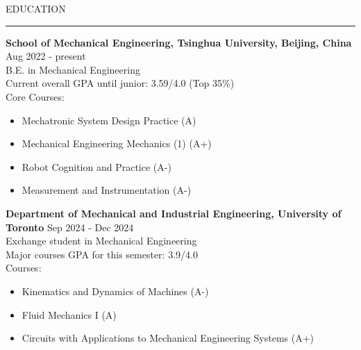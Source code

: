 \documentclass{resume} %
\renewenvironment{rSection}[1]{
\sectionskip
\textcolor{TsinghuaPurple}{\MakeUppercase{#1}}
\sectionlineskip
\hrule
\begin{list}{}{
\setlength{\leftmargin}{0em}
}
\item[]
}{
\end{list}
}
\begin{document}
  


\begin{rSection}{Education}

{\bf School of Mechanical Engineering, Tsinghua University, Beijing, China } \hfill {Aug 2022 - present}
\\ 
B.E. in Mechanical Engineering
\\
Current overall GPA until junior: 3.59/4.0 (Top 35\%)
\\
Core Courses: 
\begin{itemize}[itemsep = -0.5em, topsep = -0.5em]
    \item Mechatronic System Design Practice (A)
    \item Mechanical Engineering Mechanics (1) (A+)
    \item Robot Cognition and Practice (A-)
    \item Measurement and Instrumentation (A-)
\end{itemize}

\vspace{11pt}

{\bf Department of Mechanical and Industrial Engineering, University of Toronto} \hfill {Sep 2024 - Dec 2024}
\\ 
Exchange student in Mechanical Engineering
\\
Major courses GPA for this semester: 3.9/4.0
\\
Courses: 
\begin{itemize}[itemsep = -0.5em, topsep = -0.5em]
    \item Kinematics and Dynamics of Machines (A-)
    \item Fluid Mechanics I (A)
    \item Circuits with Applications to Mechanical Engineering Systems (A+)
\end{itemize}

\end{rSection} 
\end{document}
